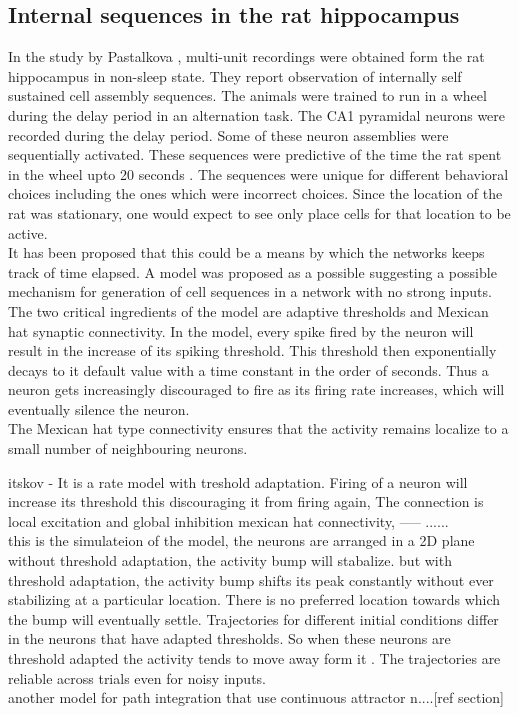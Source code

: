 \subsection{Internal sequences in the rat hippocampus}
In the study by Pastalkova \cite{Pastalkova2008a}, multi-unit recordings were obtained form the rat hippocampus in non-sleep state. They report observation of internally self sustained cell assembly sequences. The animals were trained to run in a wheel during the delay period in an alternation task. The CA1 pyramidal neurons were recorded during the delay period. Some of these neuron assemblies were sequentially activated. These sequences were predictive of the time the rat spent in the wheel upto 20 seconds \cite{Itskov2011a}. The sequences were unique for different behavioral choices including the ones which were incorrect choices. Since the location of the rat was stationary, one would expect to see only place cells for that location to be active.  \\  
[time/distance cells]
It has been proposed that this could be a means by which the networks keeps track of time elapsed. A model was proposed as a possible suggesting a possible mechanism for generation of cell sequences in a network with no strong inputs.  The two critical ingredients of the model are adaptive thresholds and Mexican hat synaptic connectivity. In the model, every spike fired by the neuron will result in the increase of its spiking threshold. This threshold then exponentially decays to it default value with a time constant in the order of seconds. Thus a neuron gets increasingly discouraged to fire as its firing rate increases, which will eventually silence the neuron. \\
The Mexican hat type connectivity ensures that the activity remains localize to a small number of neighbouring neurons. 

itskov  - It is a rate model with treshold adaptation. Firing of a neuron will increase its threshold this discouraging it from firing again, The connection is local excitation and global inhibition mexican hat connectivity, ----- ......\\
this is the simulateion of the model, the neurons are arranged in a  2D plane without threshold adaptation, the activity bump will stabalize. but with threshold adaptation, the activity bump shifts its peak constantly without ever stabilizing at a particular location. There is no preferred location towards which the bump will eventually settle. Trajectories for different initial conditions differ in the neurons that have adapted thresholds. So when these neurons are threshold adapted the activity tends to move away form it . The trajectories are reliable across trials even for noisy inputs. \\ another model for path integration that use continuous attractor n....[ref section]

